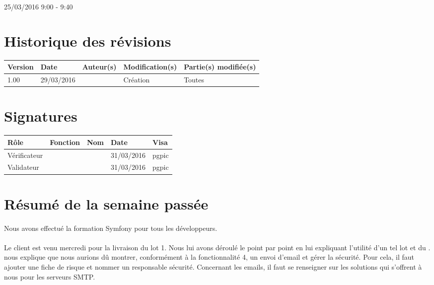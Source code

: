 \documentclass [a4paper] {article}
\begin{document}
25/03/2016			 				%
\hfill   
\hfill 	 9:00 - 9:40 				%


\section*{Historique des révisions}
\begin{center}
			\begin{tabular}{| p{2.5cm} | p{3cm} | p{3cm} | p{3cm} | p{3.5cm} |}
				\hline
				\rowcolor{Gray}
				Version & Date & Auteur(s) & Modification(s) & Partie(s) modifiée(s)		 \\
				\hline
				1.00 & 29/03/2016 & \Pierre & Création & Toutes \\
		\hline		
			\end{tabular}
		\end{center}

\section*{Signatures}

		\begin{center}
			\begin{tabular}{| p{2.5cm} | p{4cm} | p{3cm} | p{3cm} | p{2.5cm} |}
				\hline
				\rowcolor{Gray}
				Rôle & Fonction & Nom & Date & Visa		 \\
				\hline
				Vérificateur & \RQA & \Kafui & 31/03/2016 & pgpic \\[30pt]
				\hline
				Validateur & \CP & \Sergi & 31/03/2016 & pgpic \\[30pt]	
				\hline
			\end{tabular}
		\end{center}


\section{Résumé de la semaine passée}
\paragraph*{}
Nous avons effectué la formation Symfony pour tous les développeurs.

\paragraph*{}
Le client est venu mercredi pour la livraison du lot 1. Nous lui avons déroulé le \CDR{} point par point en lui expliquant l'utilité d'un tel lot et du \CDRCourt{}. \nomTuteurPedago{} nous explique que nous aurions dû montrer, conformément à la fonctionnalité 4, un envoi d'email et gérer la sécurité. Pour cela, il faut ajouter une fiche de risque et nommer un responsable sécurité. Concernant les emails, il faut se renseigner sur les solutions qui s'offrent à nous pour les serveurs SMTP.
\end{document}
